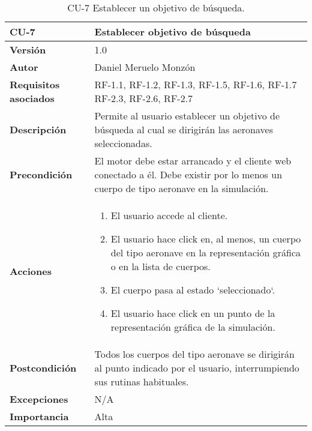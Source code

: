 \begin{table}[p]
	\centering
	\begin{tabularx}{\linewidth}{ p{} p{} }
		\toprule
		\textbf{CU-7}    & \textbf{Establecer objetivo de búsqueda}\\
		\toprule
		\textbf{Versión}              & 1.0    \\
		\textbf{Autor}                & Daniel Meruelo Monzón \\
		\textbf{Requisitos asociados} & RF-1.1, RF-1.2, RF-1.3, RF-1.5, RF-1.6, RF-1.7 RF-2.3, RF-2.6, RF-2.7 \\
		\textbf{Descripción}          & Permite al usuario establecer un objetivo de búsqueda al cual se dirigirán las aeronaves seleccionadas. \\
		\textbf{Precondición}         & El motor debe estar arrancado y el cliente web conectado a él. Debe existir por lo menos un cuerpo de tipo aeronave en la simulación. \\
		\textbf{Acciones}             &
		\begin{enumerate}
			\def\labelenumi{\arabic{enumi}.}
			\tightlist
			\item El usuario accede al cliente.
			\item El usuario hace click en, al menos, un cuerpo del tipo aeronave en la representación gráfica o en la lista de cuerpos.
                \item El cuerpo pasa al estado `seleccionado`.
                \item El usuario hace click en un punto de la representación gráfica de la simulación.
		\end{enumerate}\\
		\textbf{Postcondición}        & Todos los cuerpos del tipo aeronave se dirigirán al punto indicado por el usuario, interrumpiendo sus rutinas habituales.\\
		\textbf{Excepciones}          & N/A \\
		\textbf{Importancia}          & Alta\\
		\bottomrule
	\end{tabularx}
	\caption{CU-7 Establecer un objetivo de búsqueda.}
\end{table}